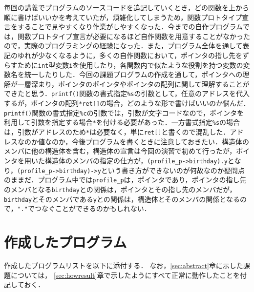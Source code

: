 毎回の講義でプログラムのソースコードを追記していくとき，どの関数を上から順に書けばいいかを考えていたが，煩雑化してしまうため，関数プロトタイプ宣言をすることで見やすくなり作業がしやすくなった\cite{book:meikai}．今までの自作プログラムでは，関数プロトタイプ宣言が必要になるほど自作関数を用意することがなかったので，実際のプログラミングの経験になった．また，プログラム全体を通して表記のゆれが少なくなるように，多くの自作関数において，ポインタの指し先をずらすために\verb|int|型変数\verb|i|を使用したり，各関数内で似たような役割を持つ変数の変数名を統一したりした．今回の課題プログラムの作成を通して，ポインタへの理解が一層深まり，ポインタのポインタやポインタの配列に関して理解することができたと思う\cite{www:label3,www:label4}．\verb|printf()|関数の書式指定\verb|%s|の引数として，任意のアドレスを代入するが，ポインタの配列\verb|*ret[]|の場合，どのような形で書けばいいのか悩んだ．\verb|printf()|関数の書式指定\verb|%c|の引数では，引数が文字コードなので，ポインタを利用して引数を指定する場合\verb|*|を付ける必要があった．一方書式指定\verb|%s|の場合は，引数がアドレスのため\verb|*|は必要なく，単に\verb|ret[]|と書くので混乱した．アドレスなのか値なのか，今後プログラムを書くときに注意しておきたい．構造体のメンバに他の構造体を含む，構造体の宣言は今回の演習で初めて行ったが，ポインタを用いた構造体のメンバの指定の仕方が，\verb|(profile_p->birthday).y|となり，\verb|(profile_p->birthday)->y|という書き方ができないのが何故なのか疑問点のままだ．プログラム中では\verb|profile_p|は，ポインタであり，ポインタの指し先のメンバとなる\verb|birthday|との関係は，ポインタとその指し先のメンバだが，\verb|birthday|とそのメンバである\verb|y|との関係は，構造体とそのメンバの関係となるので，\verb|"."|でつなぐことができるのかもしれない．

\section{作成したプログラム}\label{sec:makep}

作成したプログラムリストを以下に添付する．
なお，\ref{sec:abstract}章に示した課題については，
\ref{sec:howresult}章で示したようにすべて正常に動作したことを付記しておく．


